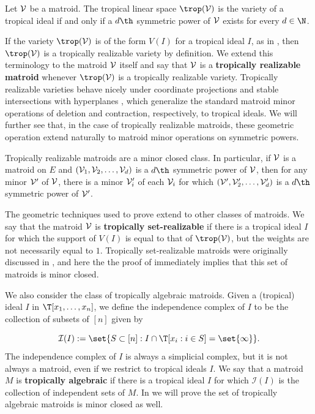 \begin{theorem}\label{thm:introThm1}
Let $\mathcal{V}$ be a matroid. The tropical linear space $\trop(\sV)$ is the variety of a tropical ideal if and only if a $d\th$ symmetric power of $\mathcal{V}$ exists for every $d\in \N$.
\end{theorem}

If the variety $\trop(\sV)$ is of the form $V(I)$ for a tropical ideal $I$, as in , then $\trop(\sV)$ is a tropically realizable variety by definition. We extend this terminology to the matroid $\mathcal{V}$ itself and say that $\mathcal{V}$ is a \textbf{tropically realizable matroid} whenever $\trop(\sV)$ is a tropically realizable variety. Tropically realizable varieties behave nicely under coordinate projections and stable intersections with hyperplanes \cite{MR20}, which generalize the standard matroid minor operations of deletion and contraction, respectively, to tropical ideals. We will further see that, in the case of tropically realizable matroids, these geometric operation extend naturally to matroid minor operations on symmetric powers.

\begin{theorem}\label{thm:introThm2}
Tropically realizable matroids are a minor closed class. In particular, if $\mathcal{V}$ is a matroid on $E$ and $(\mathcal{V}_1,\mathcal{V}_2,\dots,\mathcal{V}_d)$ is a $d\th$ symmetric power of $\mathcal{V}$, then for any minor $\mathcal{V}'$ of $\mathcal{V}$, there is a minor $\mathcal{V}'_i$ of each $\mathcal{V}_i$ for which $(\mathcal{V}',\mathcal{V}'_2,\dots, \mathcal{V}'_d)$ is a $d\th$ symmetric power of $\mathcal{V}'$.
\end{theorem}

The geometric techniques used to prove  extend to other classes of matroids. We say that the matroid $\mathcal{V}$ is \textbf{tropically set-realizable} if there is a tropical ideal $I$ for which the support of $V(I)$ is equal to that of $\trop(\sV)$, but the weights are not necessarily equal to $1$. Tropically set-realizable matroids were originally discussed in \cite{Yu17}, and here the the proof of  immediately implies that this set of matroids is minor closed. 

We also consider the class of tropically algebraic matroids. Given a (tropical) ideal $I$ in $\T[x_1,\dots,x_n]$, we define the independence complex of $I$ to be the collection of subsets of $[n]$ given by

$$\mathcal{I}(I):= \set{S\subset [n]: I\cap \T[x_i: i\in S]= \set{\infty}}.$$
The independence complex of $I$ is always a simplicial complex, but it is not always a matroid, even if we restrict to tropical ideals $I$. We say that a matroid $M$ is \textbf{tropically algebraic} if there is a tropical ideal $I$ for which $\mathcal{I}(I)$ is the collection of independent sets of $M$. In  we will prove the set of tropically algebraic matroids is minor closed as well. 

